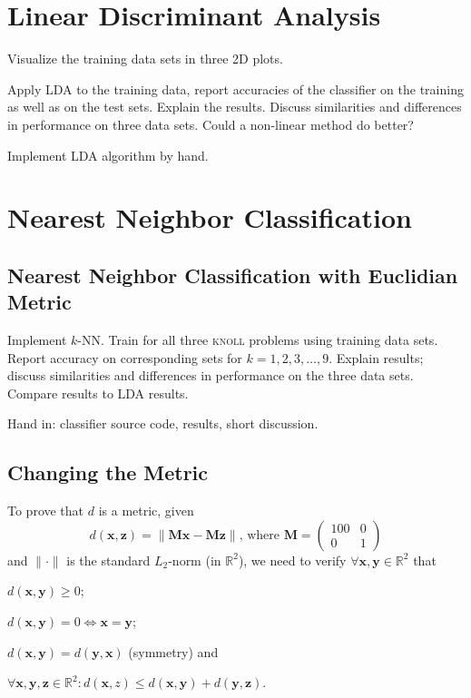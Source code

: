 \documentclass{article}
\newcommand{\vect}[1]{\ensuremath{\boldsymbol{\mathbf{#1}}}\xspace}
\begin{document}
\section{Linear Discriminant Analysis}

Visualize the training data sets in three 2D plots.

Apply LDA to the training data, report accuracies of the classifier on
the training as well as on the test sets. Explain the results. Discuss
similarities and differences in performance on three data sets. Could
a non-linear method do better?

Implement LDA algorithm by hand.

\section{Nearest Neighbor Classification}

\subsection{Nearest Neighbor Classification with Euclidian Metric}

Implement $k$-NN. Train for all three \textsc{knoll} problems using
training data sets. Report accuracy on corresponding sets for $k =
1,2,3,\dots,9$. Explain results; discuss similarities and differences
in performance on the three data sets. Compare results to LDA results.

Hand in: classifier source code, results, short discussion.

\subsection{Changing the Metric}

To prove that $d$ is a metric, given
\[
d(\vect{x},\vect{z}) = \|\vect{M}\vect{x} - \vect{M}\vect{z}\|\text{,
  where } \vect{M} = \begin{pmatrix} 100 & 0 \\ 0 & 1\end{pmatrix}
\]
and $\|\cdot\|$ is the standard $L_2$-norm (in $\mathbb{R}^2$), we
need to verify $\forall \vect{x},\vect{y}\in \mathbb{R}^2$ that
\begin{inparaenum}[1)]
  \item $d(\vect{x},\vect{y}) \geq 0$; 
  \item $d(\vect{x},\vect{y}) = 0 \Leftrightarrow \vect{x} = \vect{y}$;
  \item $d(\vect{x},\vect{y}) =  d(\vect{y},\vect{x})$ (symmetry) and
  \item $\forall \vect{x},\vect{y},\vect{z} \in \mathbb{R}^2 : d(\vect{x},z) \leq d(\vect{x},\vect{y}) + d(\vect{y},\vect{z})$.
\end{inparaenum}
\end{document}
